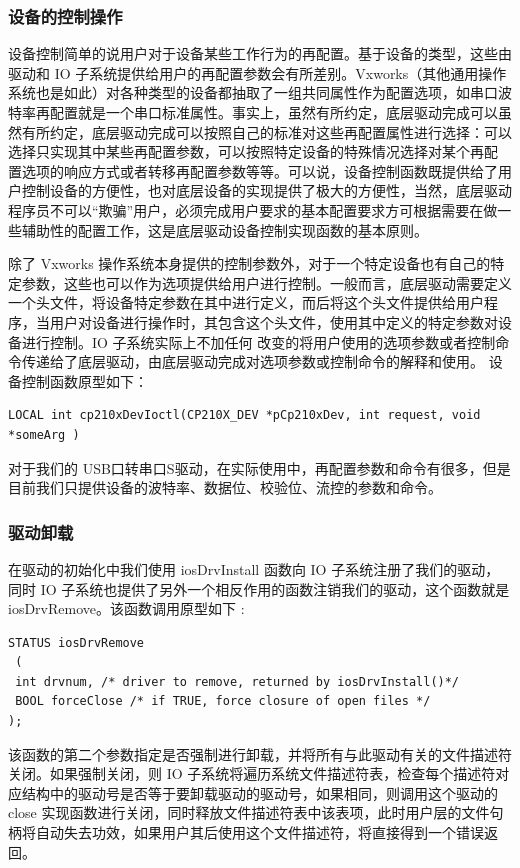 \subsubsection{设备的控制操作}
	设备控制简单的说用户对于设备某些工作行为的再配置。基于设备的类型，这些由驱动和 IO 子系统提供给用户的再配置参数会有所差别。Vxworks（其他通用操作系统也是如此）对各种类型的设备都抽取了一组共同属性作为配置选项，如串口波特率再配置就是一个串口标准属性。事实上，虽然有所约定，底层驱动完成可以虽然有所约定，底层驱动完成可以按照自己的标准对这些再配置属性进行选择：可以选择只实现其中某些再配置参数，可以按照特定设备的特殊情况选择对某个再配
置选项的响应方式或者转移再配置参数等等。可以说，设备控制函数既提供给了用户控制设备的方便性，也对底层设备的实现提供了极大的方便性，当然，底层驱动程序员不可以“欺骗”用户，必须完成用户要求的基本配置要求方可根据需要在做一些辅助性的配置工作，这是底层驱动设备控制实现函数的基本原则。

	除了 Vxworks 操作系统本身提供的控制参数外，对于一个特定设备也有自己的特定参数，这些也可以作为选项提供给用户进行控制。一般而言，底层驱动需要定义一个头文件，将设备特定参数在其中进行定义，而后将这个头文件提供给用户程序，当用户对设备进行操作时，其包含这个头文件，使用其中定义的特定参数对设备进行控制。IO 子系统实际上不加任何
改变的将用户使用的选项参数或者控制命令传递给了底层驱动，由底层驱动完成对选项参数或控制命令的解释和使用。
设备控制函数原型如下：
\lstset{language=C}
\begin{lstlisting}
LOCAL int cp210xDevIoctl(CP210X_DEV *pCp210xDev, int request, void *someArg )
\end{lstlisting}

对于我们的 USB口转串口S驱动，在实际使用中，再配置参数和命令有很多，但是目前我们只提供设备的波特率、数据位、校验位、流控的参数和命令。


\subsubsection{驱动卸载}
	在驱动的初始化中我们使用 iosDrvInstall 函数向 IO 子系统注册了我们的驱动，同时 IO 子系统也提供了另外一个相反作用的函数注销我们的驱动，这个函数就是 iosDrvRemove。该函数调用原型如下 :
\lstset{language=C}
\begin{lstlisting}
STATUS iosDrvRemove 
 ( 
 int drvnum, /* driver to remove, returned by iosDrvInstall()*/ 
 BOOL forceClose /* if TRUE, force closure of open files */ 
); 
\end{lstlisting}

该函数的第二个参数指定是否强制进行卸载，并将所有与此驱动有关的文件描述符关闭。如果强制关闭，则 IO 子系统将遍历系统文件描述符表，检查每个描述符对应结构中的驱动号是否等于要卸载驱动的驱动号，如果相同，则调用这个驱动的 close 实现函数进行关闭，同时释放文件描述符表中该表项，此时用户层的文件句柄将自动失去功效，如果用户其后使用这个文件描述符，将直接得到一个错误返回。

